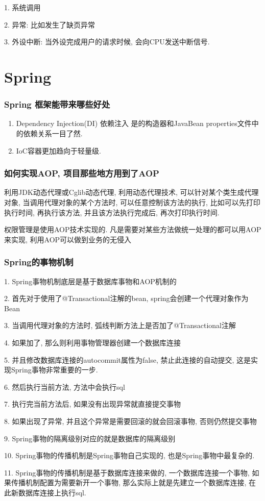 \documentclass[UTF8]{ctexart}
\begin{document}
1. 系统调用

2. 异常: 比如发生了缺页异常

3. 外设中断: 当外设完成用户的请求时候, 会向CPU发送中断信号.


	\section{Spring}
	\subsubsection{Spring 框架能带来哪些好处}

	\begin{enumerate}
		\item Dependency Injection(DI) 依赖注入 是的构造器和JavaBean properties文件中的依赖关系一目了然.
		\item IoC容器更加趋向于轻量级.
	\end{enumerate}
\subsubsection{如何实现AOP, 项目那些地方用到了AOP}
利用JDK动态代理或Cglib动态代理, 利用动态代理技术, 可以针对某个类生成代理对象, 当调用代理对象的某个方法时, 可以任意控制该方法的执行, 比如可以先打印执行时间, 再执行该方法, 并且该方法执行完成后, 再次打印执行时间. \par
权限管理是使用AOP技术实现的. 凡是需要对某些方法做统一处理的都可以用AOP来实现, 利用AOP可以做到业务的无侵入 \par
\subsubsection{Spring的事物机制}
1. Spring事物机制底层是基于数据库事物和AOP机制的 \par
2. 首先对于使用了@Transactional注解的bean, spring会创建一个代理对象作为Bean \par
3. 当调用代理对象的方法时, 弧线判断方法上是否加了@Transactional注解 \par
4. 如果加了, 那么则利用事物管理器创建一个数据库连接 \par
5. 并且修改数据库连接的autocommit属性为false, 禁止此连接的自动提交, 这是实现Spring事物非常重要的一步. \par
6. 然后执行当前方法, 方法中会执行sql \par
7. 执行完当前方法后, 如果没有出现异常就直接提交事物 \par
8. 如果出现了异常, 并且这个异常是需要回滚的就会回滚事物, 否则仍然提交事物 \par
9. Spring事物的隔离级别对应的就是数据库的隔离级别 \par
10. Spring事物的传播机制是Spring事物自己实现的, 也是Spring事物中最复杂的. \par
11. Spring事物的传播机制是基于数据库连接来做的, 一个数据库连接一个事物, 如果传播机制配置为需要新开一个事物, 那么实际上就是先建立一个数据库连接, 在此新数据库连接上执行sql.
\end{document}
